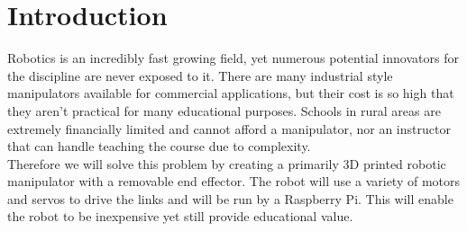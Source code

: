 \documentclass[12pt]{report}
\begin{document}
\normalem

{\tableofcontents\let\clearpage\relax\listoffigures\let\clearpage\relax\listoftables}
\clearpage
\newpage




\section{Introduction}
Robotics is an incredibly fast growing field, yet numerous potential innovators for the discipline are never exposed to it. There are many industrial style manipulators available for commercial applications, but their cost is so high that they aren’t practical for many educational purposes. Schools in rural areas are extremely financially limited and cannot afford a manipulator, nor an instructor that can handle teaching the course due to complexity. \\
Therefore we will solve this problem by creating a primarily 3D printed robotic manipulator with a removable end effector. The robot will use a variety of motors and servos to drive the links and will be run by a Raspberry Pi. This will enable the robot to be inexpensive yet still provide educational value.
\end{document}
